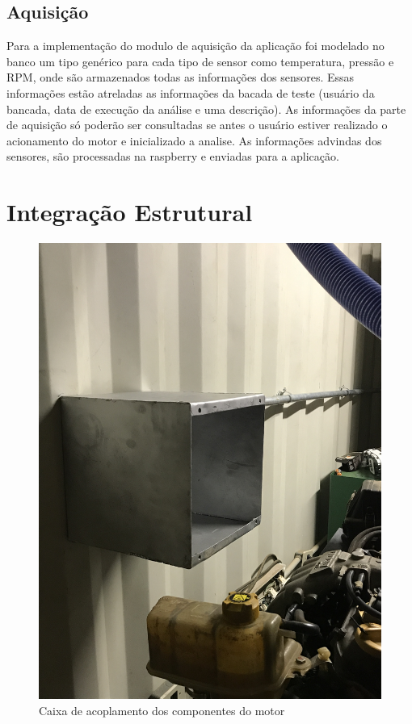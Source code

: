 \subsection{Aquisição}

Para a implementação do modulo de aquisição da aplicação foi modelado no banco um tipo genérico para cada tipo de sensor como temperatura, pressão e RPM, onde são armazenados todas as informações dos sensores. Essas informações estão atreladas as informações da bacada de teste (usuário da bancada, data de execução da análise e uma descrição). As informações da parte de aquisição só poderão ser consultadas se antes o usuário estiver realizado o acionamento do motor e inicializado a analise. 
As informações advindas dos sensores, são processadas na raspberry e enviadas para a aplicação. 

\section{Integração Estrutural}

\begin{figure}[h!]
	\centering
	\includegraphics[angle=270,keepaspectratio=true,scale= 0.09]{figuras/caixaDeAcoplamentoDosComponentesEletronicos.JPG}
	\caption{Caixa de acoplamento dos componentes do motor}
	\label{caixaDeAcoplamento}
\end{figure}


